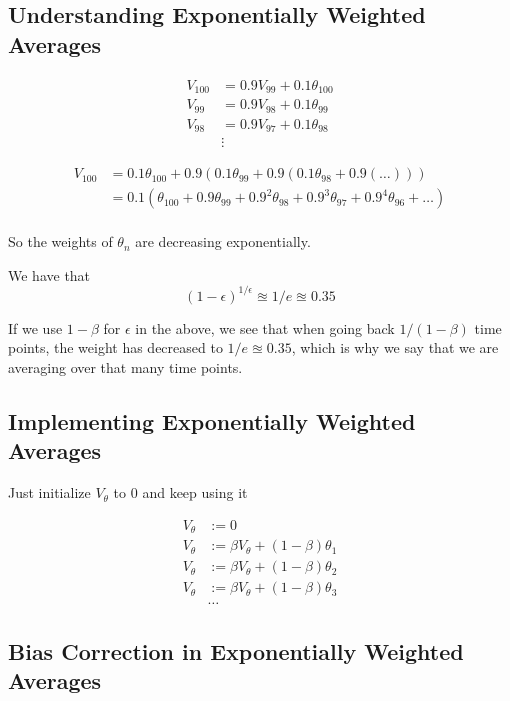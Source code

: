\subsection*{Understanding Exponentially Weighted Averages}

\begin{align*}
    V_100 &= 0.9V_{99} + 0.1 \theta_{100} \\
    V_99  &= 0.9V_{98} + 0.1 \theta_{99} \\
    V_98  &= 0.9V_{97} + 0.1 \theta_{98} \\
          & \vdots 
\end{align*}

\begin{align*}
    V_{100} & = 0.1 \theta_{100} + 
                0.9 (0.1 \theta_{99} + 0.9(0.1 \theta_{98} + 0.9(\ldots))) \\
            & = 0.1 (\theta_{100} + 0.9 \theta_{99} +0.9^2 \theta_{98} +0.9^3 \theta_{97} + 0.9^4 \theta_{96} + \ldots) \\
\end{align*}

So the weights of $\theta_n$ are decreasing exponentially.

We have that 
\[
    (1-\epsilon)^{1 / \epsilon} \approxeq 1/e \approxeq 0.35
\]

If we use $1 - \beta$ for $\epsilon$ in the above, we see that when going back $1 / (1 - \beta)$  time points, 
the weight has decreased to $1/e \approxeq 0.35$, which is why we say that we are averaging over that many time points.

\subsection*{Implementing Exponentially Weighted Averages}

Just initialize $V_{\theta}$ to $0$ and keep using it

\begin{align*}
    V_{\theta} &:= 0 \\
    V_{\theta} &:= \beta V_{\theta} + (1 - \beta) \theta_1 \\
    V_{\theta} &:= \beta V_{\theta} + (1 - \beta) \theta_2 \\
    V_{\theta} &:= \beta V_{\theta} + (1 - \beta) \theta_3 \\
    & \ldots 
\end{align*}

\subsection*{Bias Correction in Exponentially Weighted Averages}

